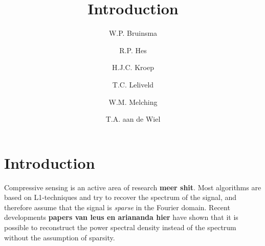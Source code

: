 \documentclass[a4paper, openany, oneside]{memoir}
\title{Introduction}
\author{W.P. Bruinsma \and R.P. Hes \and H.J.C. Kroep \and T.C. Leliveld \and W.M. Melching \and T.A. aan de Wiel}
\begin{document}
\section{Introduction}
Compressive sensing is an active area of research \textbf{meer shit}. Most algorithms are based on L1-techniques and try to recover the spectrum of the signal, and therefore assume that the signal is \emph{sparse} in the Fourier domain. Recent developments \textbf{papers van leus en ariananda hier} have shown that it is possible to reconstruct the power spectral density instead of the spectrum without the assumption of sparsity.
\end{document}
